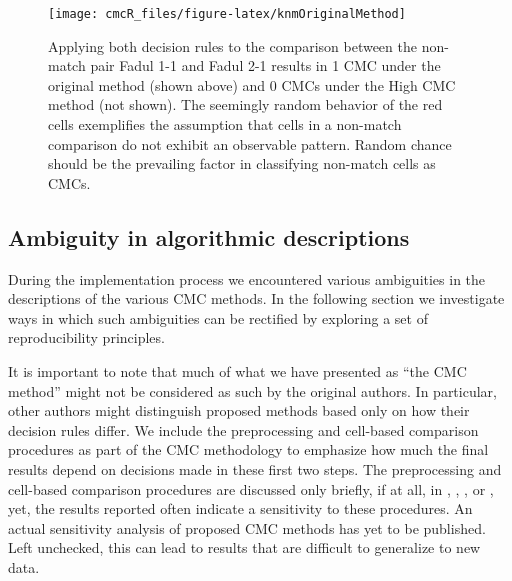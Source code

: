 \begin{Schunk}
\begin{figure}[htbp]

{\centering \texttt{[image: cmcR\_files/figure-latex/knmOriginalMethod]} 

}

\caption{\label{fig:knmCMCPlot} Applying both decision rules to the comparison between the non-match pair Fadul 1-1 and Fadul 2-1 results in 1 CMC under the original method (shown above) and 0 CMCs under the High CMC method (not shown). The seemingly random behavior of the red cells exemplifies the assumption that cells in a non-match comparison do not exhibit an observable pattern. Random chance should be the prevailing factor in classifying non-match cells as CMCs.}\label{fig:unnamed-chunk-18}
\end{figure}
\end{Schunk}

\hypertarget{ambiguities}{%
\subsection{Ambiguity in algorithmic descriptions}\label{ambiguities}}

During the implementation process we encountered various ambiguities in
the descriptions of the various CMC methods. In the following section we
investigate ways in which such ambiguities can be rectified by exploring
a set of reproducibility principles.

It is important to note that much of what we have presented as ``the CMC
method'' might not be considered as such by the original authors. In
particular, other authors might distinguish proposed methods based only
on how their decision rules differ. We include the preprocessing and
cell-based comparison procedures as part of the CMC methodology to
emphasize how much the final results depend on decisions made in these
first two steps. The preprocessing and cell-based comparison procedures
are discussed only briefly, if at all, in \citet{song_3d_2014},
\citet{tong_fired_2014}, \citet{tong_improved_2015}, or
\citet{chen_convergence_2017}, yet, the results reported often indicate
a sensitivity to these procedures. An actual sensitivity analysis of
proposed CMC methods has yet to be published. Left unchecked, this can
lead to results that are difficult to generalize to new data.

